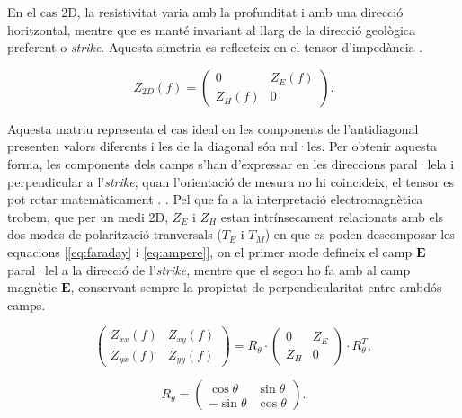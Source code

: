 \documentclass[11pt,a4paper,oneside]{article}
\begin{document}
\vspace{5pt}

En el cas 2D, la resistivitat varia amb la profunditat i amb una direcció horitzontal, mentre que es manté invariant al llarg de la direcció geològica preferent o \emph{strike}. Aquesta simetria es reflecteix en el tensor d'impedància \citep{weaver2000,marti2004}.
\vspace{5pt}

\begin{equation}
    Z_{2D}(f) = \begin{pmatrix} 0 & Z_E(f) \\ Z_H(f) & 0 \end{pmatrix}.
    \label{eq:8}
\end{equation}

\vspace{5pt}

Aquesta matriu representa el cas ideal on les components de l'antidiagonal presenten valors diferents i les de la diagonal són nul·les. Per obtenir aquesta forma, les components dels camps s'han d'expressar en les direccions paral·lela i perpendicular a l'\emph{strike}; quan l'orientació de mesura no hi coincideix, el tensor es pot rotar matemàticament \citep{rosell2013,marti2004}.
\vspace{5pt}. Pel que fa a la interpretació electromagnètica trobem, que per un medi 2D, $Z_E$ i $Z_H$ estan intrínsecament relacionats amb els dos modes de polarització tranversals ($T_E$ i $T_M$) en que es poden descomposar les equacions [\cref{eq:faraday} i \cref{eq:ampere}], on el primer mode defineix el camp $\mathbf{E}$ paral·lel a la direcció de l'\emph{strike}, mentre que el segon ho fa amb al camp magnètic $\mathbf{E}$, conservant sempre la propietat de perpendicularitat entre ambdós camps.

\begin{equation}
    \begin{pmatrix} Z_{xx}(f) & Z_{xy}(f) \\ Z_{yx}(f) & Z_{yy}(f) \end{pmatrix} = R_\theta \cdot \begin{pmatrix} 0 & Z_E \\ Z_H & 0 \end{pmatrix} \cdot R_\theta^T,
    \label{eq:9}
\end{equation}


\begin{equation}
    R_\theta = \begin{pmatrix} \cos\theta & \sin\theta \\ -\sin\theta & \cos\theta \end{pmatrix}.
    \label{eq:10}
\end{equation}
\end{document}
